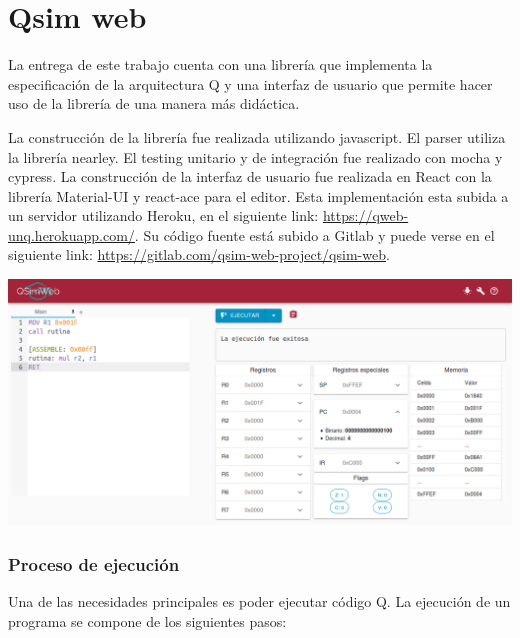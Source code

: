 \part{Qsim web}
\label{qsimweb}
La entrega de este trabajo cuenta con una librería que implementa la especificación de la arquitectura Q y una interfaz de usuario que permite hacer uso de la librería de una manera más didáctica.

La construcción de la librería fue realizada utilizando javascript. El parser utiliza la librería nearley. El testing unitario y de integración fue realizado con mocha y cypress.
La construcción de la interfaz de usuario fue realizada en React con la librería Material-UI y react-ace para el editor. 
Esta implementación esta subida a un servidor utilizando Heroku, en el siguiente link: \href{https://qweb-unq.herokuapp.com/}{https://qweb-unq.herokuapp.com/}.
Su código fuente está subido a Gitlab y puede verse en el siguiente link: \href{https://gitlab.com/qsim-web-project/qsim-web}{https://gitlab.com/qsim-web-project/qsim-web}.
\begin{center}
  \includegraphics[width=14cm]{figuras/app-completa-bb.png}
\end{center}

\section{Proceso de ejecución}
Una de las necesidades principales es poder ejecutar código Q. La ejecución de un programa se compone de los siguientes pasos:

